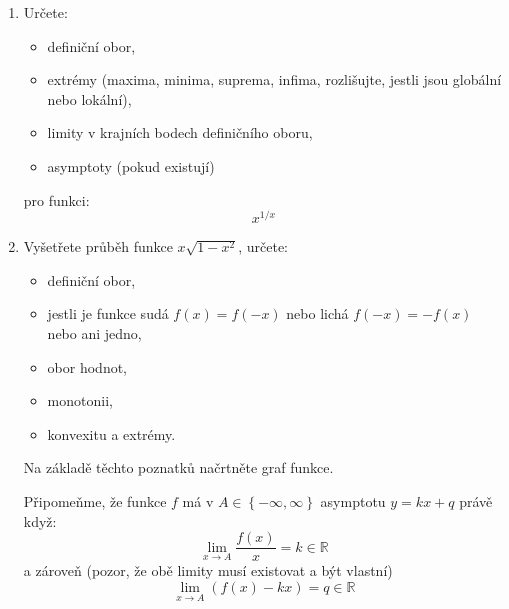 \begin{enumerate}

	\item  Určete:
			\begin{itemize}
				\item  definiční obor,
				\item  extrémy (maxima, minima, suprema, infima, rozlišujte, jestli jsou globální nebo lokální),
				\item  limity v krajních bodech definičního oboru,
				\item  asymptoty (pokud existují)
			\end{itemize}
			pro funkci:
			$$x^{1/x}$$

		\item  Vyšetřete průběh funkce $x \sqrt{1-x^2}$, určete:
			\begin{itemize}
				\item  definiční obor,
				\item  jestli je funkce sudá $f(x) = f(-x)$ nebo lichá $f(-x) = -f(x)$ nebo ani jedno,
				\item  obor hodnot,
				\item  monotonii,
				\item  konvexitu a extrémy.
			\end{itemize}
			Na základě těchto poznatků načrtněte graf funkce.

			Připomeňme, že funkce $f$ má v $A \in \left\{ -\infty, \infty \right\}$ asymptotu $y = kx + q$ právě když:
			$$\lim_{x \rightarrow A} \frac{f(x)}{x} = k \in \mathbb{R}$$
			a zároveň (pozor, že obě limity musí existovat a být vlastní)
			$$\lim_{x \rightarrow A} \left( f(x) - kx \right) = q \in \mathbb{R}$$

\end{enumerate}

